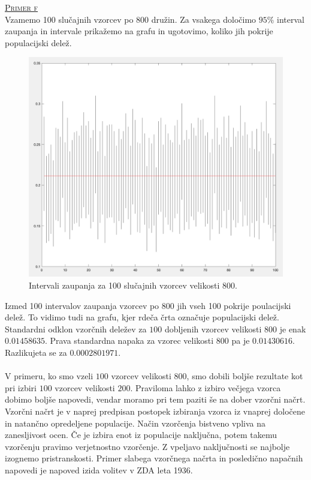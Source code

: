\documentclass[a4paper,12pt]{article}
\begin{document}
\noindent
\textsc{\underline{Primer f}}
\\
Vzamemo 100 slučajnih vzorcev po 800 družin. Za vsakega določimo $95 \%$ interval zaupanja in intervale prikažemo na grafu in ugotovimo, koliko jih pokrije populacijski delež. 
\begin{figure}[ht!]
    \centering
    \includegraphics[width=120mm]{CI_800.png}
    \caption{Intervali zaupanja za 100 slučajnih vzorcev velikosti 800.}
\end{figure}

\noindent
Izmed 100 intervalov zaupanja vzorcev po 800 jih vseh 100 pokrije poulacijski delež. To vidimo tudi na grafu, kjer rdeča črta označuje populacijski delež.
\\
Standardni odklon vzorčnih deležev za $100$ dobljenih vzorcev velikosti $800$ je enak $0.01458635$. Prava standardna napaka za vzorec velikosti $800$ pa je $0.01430616$.
Razlikujeta se za $0.0002801971$.
\\
\\
V primeru, ko smo vzeli $100$ vzorcev velikosti $800$, smo dobili boljše rezultate kot pri izbiri $100$ vzorcev velikosti $200$. 
Praviloma lahko z izbiro večjega vzorca dobimo boljše napovedi, vendar moramo pri tem paziti še na dober vzorčni načrt. Vzorčni načrt je v naprej predpisan postopek izbiranja vzorca iz vnaprej določene in natančno opredeljene populacije. 
Način vzorčenja bistveno vpliva na zanesljivost ocen. Če je izbira enot iz populacije naključna, potem takemu vzorčenju pravimo verjetnostno vzorčenje. Z vpeljavo naključnosti se najbolje izognemo pristranskosti.
Primer slabega vzorčnega načrta in posledično napačnih napovedi je napoved izida volitev v ZDA leta 1936. 
\\
\end{document}
